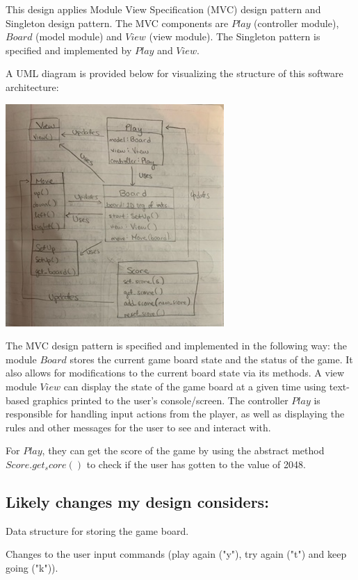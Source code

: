 \documentclass[12pt]{article}
\begin{document}
This design applies Module View Specification (MVC) design pattern and Singleton design pattern. The MVC components are 
$Play$ (controller module), $Board$ (model module) and $View$ (view module). The Singleton pattern is specified and 
implemented by $Play$ and $View$. 

A UML diagram is provided below for visualizing the structure of this software architecture:

\begin{center}
	\includegraphics[scale=0.7]{image0}
\end{center}

The MVC design pattern is specified and implemented in the following way: the module $Board$ stores the current game board
state and the status of the game. It also allows for modifications to the current board state via its methods. A view module 
$View$ can display the state of the game board at a given time using text-based graphics printed to the user's console/screen. 
The controller $Play$ is responsible for handling input actions from the player, as well as displaying the rules and other 
messages for the user to see and interact with. 

For $Play$, they can get the score of the game by using the abstract method $Score.get_score()$ to check if the user has 
gotten to the value of 2048. 


\subsection* {Likely changes my design considers:}

\noindent Data structure for storing the game board.

\noindent Changes to the user input commands (play again ("y"), try again ("t") and keep going ("k")).
\end{document}
